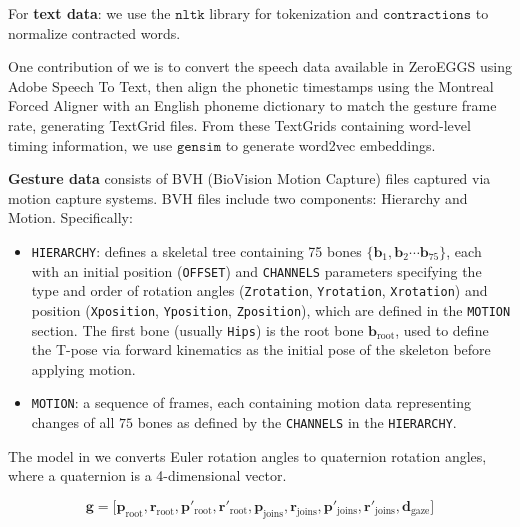 For \textbf{text data}: we use the $\texttt{nltk}$ library for tokenization and $\texttt{contractions}$ to normalize contracted words.

One contribution of we is to convert the speech data available in ZeroEGGS using Adobe Speech To Text, then align the phonetic timestamps using the Montreal Forced Aligner \cite{saxon2020robust} with an English phoneme dictionary to match the gesture frame rate, generating TextGrid files. From these TextGrids containing word-level timing information, we use $\texttt{gensim}$ to generate word2vec embeddings.

\textbf{Gesture data} consists of BVH (BioVision Motion Capture) files captured via motion capture systems. BVH files include two components: Hierarchy and Motion. Specifically:

\begin{itemize}
	\item \texttt{HIERARCHY}: defines a skeletal tree containing 75 bones $\{ \mathbf{b}_1, \mathbf{b}_2 \cdots \mathbf{b}_{75} \}$, each with an initial position (\texttt{OFFSET}) and \texttt{CHANNELS} parameters specifying the type and order of rotation angles (\texttt{Zrotation}, \texttt{Yrotation}, \texttt{Xrotation}) and position (\texttt{Xposition}, \texttt{Yposition}, \texttt{Zposition}), which are defined in the \texttt{MOTION} section. The first bone (usually \texttt{Hips}) is the root bone $\mathbf{b}_{\text{root}}$, used to define the T-pose via forward kinematics as the initial pose of the skeleton before applying motion.
	
	\item \texttt{MOTION}: a sequence of frames, each containing motion data representing changes of all $75$ bones as defined by the \texttt{CHANNELS} in the \texttt{HIERARCHY}.
\end{itemize}

The model in we converts Euler rotation angles to quaternion rotation angles, where a quaternion is a 4-dimensional vector.

\begin{equation} \label{eq:gesturevector}
	\mathbf{g} = \Big[ \mathbf{p}_{\text{root}},  \mathbf{r}_{\text{root}},
	\mathbf{ p }'_{\text{root}},  \mathbf{r}'_{\text{root}},
	\mathbf{p}_{\text{joins}},  \mathbf{r}_{\text{joins}},
	\mathbf{p}'_{\text{joins}},  \mathbf{r}'_{\text{joins}},
	\mathbf{d}_{\text{gaze}}
	\Big]
\end{equation}

